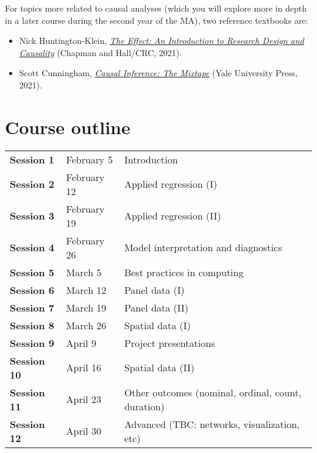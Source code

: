 \documentclass[12pt, a4paper]{article}
\begin{document}
For topics more related to causal analyses (which you will explore more in depth in a later course during the second year of the MA), two reference textbooks are:

\begin{itemize}
\setlength\itemsep{-5pt}
  \item Nick Huntington-Klein, \href{https://theeffectbook.net/}{\textit{The Effect: An Introduction to Research Design and Causality}} (Chapman and Hall/CRC, 2021).
  \item Scott Cunningham, \href{https://mixtape.scunning.com/}{\textit{Causal Inference: The Mixtape}} (Yale University Press, 2021).
\end{itemize}

\section{Course outline}


\begin{table*}[!ht]
  \centering

  \begin{tabular}{lll}
    \textbf{Session 1} & February 5 & Introduction \\
    \textbf{Session 2} & February 12 & Applied regression (I) \\
    \textbf{Session 3} & February 19 & Applied regression (II) \\
    \textbf{Session 4} & February 26 & Model interpretation and diagnostics \\
    \textbf{Session 5} & March 5 & Best practices in computing \\
    \textbf{Session 6} & March 12 & Panel data (I) \\
    \textbf{Session 7} & March 19 & Panel data (II) \\
    \textbf{Session 8} & March 26 & Spatial data (I) \\
    \textbf{Session 9} &  April 9 & Project presentations \\
    \textbf{Session 10} & April 16 & Spatial data (II) \\
    \textbf{Session 11} & April 23 & Other outcomes (nominal, ordinal, count, duration) \\
    \textbf{Session 12} & April 30 & Advanced (TBC: networks, visualization, etc) \\
  \end{tabular}
\end{table*}

\end{document}
